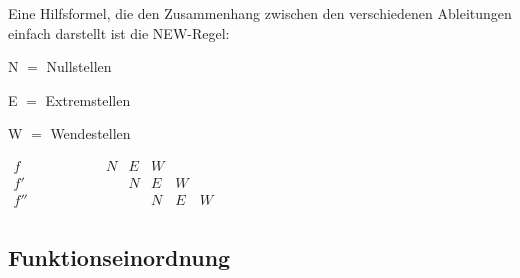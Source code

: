 \documentclass[main.tex]{subfiles}
\begin{document}
\begin{Bemerkung}
  \label{NEW-Regel}
	Eine Hilfsformel, die den Zusammenhang zwischen den verschiedenen Ableitungen einfach darstellt ist die NEW-Regel:

	\begin{minipage}[b]{0.2\linewidth}
		N $=$ Nullstellen

		E $=$ Extremstellen
		
		W $=$ Wendestellen
	\end{minipage}
	\hfill \vline \hfill
	\begin{minipage}[b]{0.4\linewidth}
		$\begin{array}{rcccccl}
			f & \qquad \qquad& N & E & W & & \\
			f' & \qquad \qquad && N & E & W & \\
			f'' & \qquad \qquad &&& N & E & W \\
		\end{array}$
	\end{minipage}
\end{Bemerkung}


\subsection{Funktionseinordnung}
\end{document}
